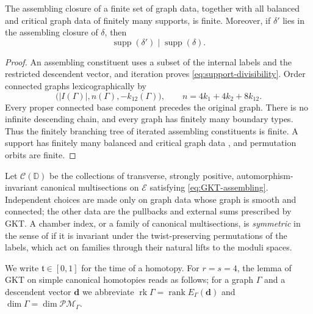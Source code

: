 \begin{lemma}\label{lem:finite-GKT-closure}
The assembling closure of a finite set of graph data, together with all
balanced and critical graph data of finitely many supports, is finite.
Moreover, if $\delta'$ lies in the assembling closure of $\delta$, then
\begin{equation}\label{eq:support-divisibility}
 \operatorname{supp}(\delta')\mid\operatorname{supp}(\delta).
\end{equation}
\end{lemma}

\begin{proof}
An assembling constituent uses a subset of the internal labels and the
restricted descendent vector, and iteration proves \eqref{eq:support-divisibility}.  Order connected
graphs lexicographically by
\[
 \bigl(|I(\Gamma)|,n(\Gamma),-k_{12}(\Gamma)\bigr),
 \qquad n=4k_1+4k_2+8k_{12}.
\]
Every proper connected base component precedes the original graph.  There is
no infinite descending chain, and every graph has finitely many boundary
types.  Thus the finitely branching tree of iterated assembling constituents is
finite.  A support
has finitely many balanced and critical graph data
\cite[Notation~2.40]{grossetal2022open}, and permutation orbits are finite.
\end{proof}

Let $\mathcal C(\mathbb D)$ be the collections of transverse, strongly
positive, automorphism-invariant canonical multisections on $\mathcal E$
satisfying \eqref{eq:GKT-assembling}.  Independent choices are made only on
graph data whose graph is smooth and connected; the other data are the
pullbacks and external sums prescribed by GKT.  A chamber index, or a
family of canonical multisections, is \emph{symmetric} in the sense of
\cite[Notation~3.42 and Def.~3.43]{grossetal2022open} if it is invariant
under the twist-preserving permutations of the labels, which act on families
through their natural lifts to the moduli spaces.

We write $\mathfrak t\in[0,1]$ for the time of a homotopy.  For $r=s=4$, the
lemma of GKT on simple canonical homotopies reads as follows; for a graph
$\Gamma$ and a descendent vector $\mathbf d$ we abbreviate
$\operatorname{rk}\Gamma=\operatorname{rank}E_\Gamma(\mathbf d)$ and
$\dim\Gamma=\dim\mathcal{PM}_\Gamma$.

